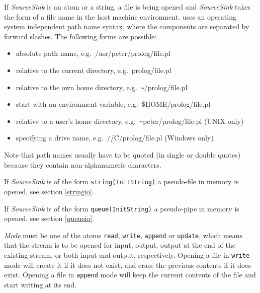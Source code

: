 If {\it SourceSink} is an atom or a string, a file is being opened
and {\it SourceSink} takes
the form of a file name in the host machine environment.
{\eclipse} uses an operating
system independent path name syntax, where the components are separated by
forward slashes.
The following forms are possible:
\begin{itemize}
\item absolute path name, e.g.\ /usr/peter/prolog/file.pl
\item relative to the current directory, e.g.\ prolog/file.pl
\item relative to the own home directory, e.g.\ \verb$~$/prolog/file.pl
\item start with an environment variable, e.g.\ \$HOME/prolog/file.pl
\item relative to a user's home directory, e.g.\ \verb$~$peter/prolog/file.pl
	(UNIX only)
\item specifying a drive name, e.g.\ //C/prolog/file.pl
	(Windows only)
\end{itemize}
Note that path names usually have to be quoted (in single or double quotes)
because they contain non-alphanumeric characters.

If {\it SourceSink} is of the form {\tt string(InitString)} a pseudo-file
in memory is opened, see section \ref{stringio}.

If {\it SourceSink} is of the form {\tt queue(InitString)} a pseudo-pipe
in memory is opened, see section \ref{queueio}.

{\it Mode} must be one of the atoms {\tt read}, {\tt write}, {\tt append} or
{\tt update},
which means that the stream is to be opened for input, output, output at the
end of the existing stream, or both input and output, respectively.
Opening a file in {\tt write} mode will create it if it does not exist,
and erase the previous contents if it does exist.
Opening a file in {\tt append} mode will keep the current contents
of the file and start writing at its end.

